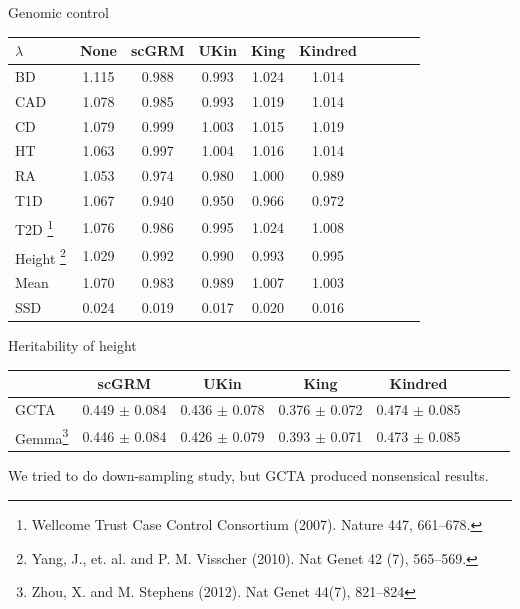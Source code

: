 \documentclass[]{beamer}
\begin{document}
\begin{frame}{Genomic control}
\begin{center}
\begin{tabular}{lccccccccc}
{$\lambda$} &  {None} &  {scGRM}& {UKin} & {King}    & {Kindred} \\ 
 \hline
BD &   1.115  & 0.988 & 0.993 & 1.024   & 1.014 \\
CAD   & 1.078  & 0.985 & 0.993 & 1.019  &1.014 \\
CD   & 1.079   & 0.999 & 1.003 & 1.015  &1.019 \\
HT   & 1.063  & 0.997 & 1.004 & 1.016  &1.014  \\
 RA  & 1.053   & 0.974 & 0.980& 1.000  & 0.989 \\
T1D   & 1.067   & 0.940 & 0.950 & 0.966  &0.972 \\
T2D \footnote{Wellcome Trust Case Control Consortium (2007). Nature 447, 661–678.}    & 1.076   & 0.986 & 0.995 &1.024 &1.008  \\
Height \footnote{Yang, J., et. al. and P. M. Visscher (2010). Nat Genet 42 (7), 565–569.
}   & 1.029   & 0.992 & 0.990 &0.993  & 0.995  \\
\hline
Mean & 1.070& 0.983 & 0.989 & 1.007 & 1.003 \\
SSD & 0.024& 0.019 &  0.017 &  0.020 & 0.016 \\
  \end{tabular}
  \end{center}
\end{frame}
%
%
%
%
\begin{frame}{Heritability of height}

{\small
\begin{center}
\begin{tabular}{lccccccc}
   &  {scGRM}& {UKin} & {King}    & {Kindred} \\ 
   \hline
GCTA   &0.449 $\pm$ 0.084 & 0.436 $\pm$ 0.078 &0.376 $\pm$ 0.072 &0.474 $\pm$ 0.085 \\
Gemma\footnote{Zhou, X. and M. Stephens (2012). Nat Genet 44(7), 821–824} &0.446 $\pm$ 0.084 & 0.426 $\pm$ 0.079 & 0.393 $\pm$ 0.071 &0.473 $\pm$ 0.085  \\
\hline
\end{tabular}
\end{center}
We tried to do down-sampling study, but GCTA produced nonsensical results. 

}
\end{frame}
\end{document}

